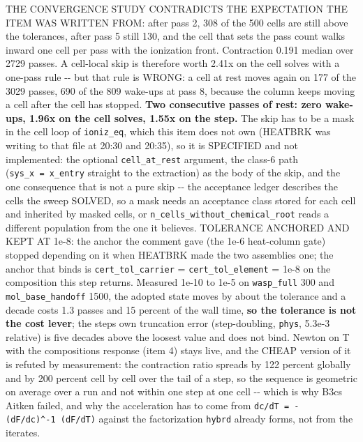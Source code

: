 \documentclass[english,a4paper]{my_memo}
\begin{document}
\begin{itemize}
  THE CONVERGENCE STUDY CONTRADICTS THE EXPECTATION THE ITEM WAS WRITTEN
  FROM: after pass 2, 308 of the 500 cells are still above the tolerances,
  after pass 5 still 130, and the cell that sets the pass count walks inward
  one cell per pass with the ionization front. Contraction 0.191 median over
  2729 passes. A cell-local skip is therefore worth 2.41x on the cell solves
  with a one-pass rule -\/- but that rule is WRONG: a cell at rest moves again
  on 177 of the 3029 passes, 690 of the 809 wake-ups at pass 8, because the
  column keeps moving a cell after the cell has stopped. \textbf{Two consecutive
  passes of rest: zero wake-ups, 1.96x on the cell solves, 1.55x on the
  step.} The skip has to be a mask in the cell loop of \texttt{ioniz\_eq}, which
  this item does not own (HEATBRK was writing to that file at 20:30 and
  20:35), so it is SPECIFIED and not implemented: the optional
  \texttt{cell\_at\_rest} argument, the class-6 path (\texttt{sys\_x\ =\ x\_entry} straight to
  the extraction) as the body of the skip, and the one consequence that is
  not a pure skip -\/- the acceptance ledger describes the cells the sweep
  SOLVED, so a mask needs an acceptance class stored for each cell and inherited by
  masked cells, or \texttt{n\_cells\_without\_chemical\_root} reads a different
  population from the one it believes. TOLERANCE ANCHORED AND KEPT AT 1e-8:
  the anchor the comment gave (the 1e-6 heat-column gate) stopped depending
  on it when HEATBRK made the two assemblies one; the anchor that binds is
  \texttt{cert\_tol\_carrier} = \texttt{cert\_tol\_element} = 1e-8 on the composition this step
  returns. Measured 1e-10 to 1e-5 on \texttt{wasp\_full} 300 and \texttt{mol\_base\_handoff}
  1500, the adopted state moves by about the tolerance and a decade costs 1.3
  passes and 15 percent of the wall time, \textbf{so the tolerance is not the cost
  lever}; the step\textquotesingle s own truncation error (step-doubling, \texttt{phys}, 5.3e-3
  relative) is five decades above the loosest value and does not bind.
  Newton on T with the composition\textquotesingle s response (item 4) stays live, and the
  CHEAP version of it is refuted by measurement: the contraction ratio
  spreads by 122 percent globally and by 200 percent cell by cell over the tail
  of a step, so the sequence is geometric on average over a run and not
  within one step at one cell -\/- which is why B3c\textquotesingle s Aitken failed, and why
  the acceleration has to come from \texttt{dc/dT\ =\ -(dF/dc)\^{}-1\ (dF/dT)} against
  the factorization \texttt{hybrd} already forms, not from the iterates.

\end{itemize}
\end{document}
